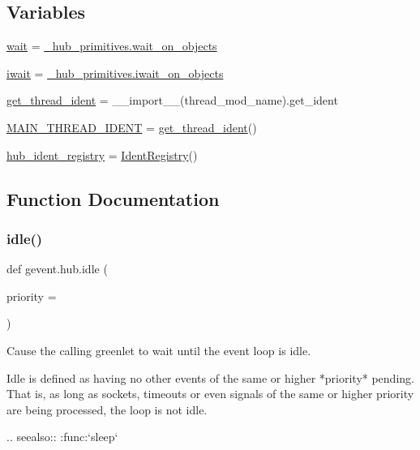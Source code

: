 \subsection*{Variables}
\begin{DoxyCompactItemize}
\item 
\hyperlink{namespacegevent_1_1hub_a5ed661434216439b7d4f2ca4c79fd94f}{wait} = \hyperlink{namespacegevent_1_1__hub__primitives_a670618f9da100eaaa5d2a7b80b746926}{\+\_\+hub\+\_\+primitives.\+wait\+\_\+on\+\_\+objects}
\item 
\hyperlink{namespacegevent_1_1hub_ac0495f7b4e74e001a73e04cb1f92978a}{iwait} = \hyperlink{namespacegevent_1_1__hub__primitives_ae5fd0efa38447d7a7a15f9218ae50c19}{\+\_\+hub\+\_\+primitives.\+iwait\+\_\+on\+\_\+objects}
\item 
\hyperlink{namespacegevent_1_1hub_a25afe960c9af2c46325de894129e1ed2}{get\+\_\+thread\+\_\+ident} = \+\_\+\+\_\+import\+\_\+\+\_\+(thread\+\_\+mod\+\_\+name).get\+\_\+ident
\item 
\hyperlink{namespacegevent_1_1hub_aed3ef3b0ddba2d582cc0b88e3ea2d48f}{M\+A\+I\+N\+\_\+\+T\+H\+R\+E\+A\+D\+\_\+\+I\+D\+E\+NT} = \hyperlink{namespacegevent_1_1hub_a25afe960c9af2c46325de894129e1ed2}{get\+\_\+thread\+\_\+ident}()
\item 
\hyperlink{namespacegevent_1_1hub_aa8f1583d65977ad5d085a66b354a9485}{hub\+\_\+ident\+\_\+registry} = \hyperlink{classgevent_1_1__ident_1_1_ident_registry}{Ident\+Registry}()
\end{DoxyCompactItemize}


\subsection{Function Documentation}
\mbox{\label{namespacegevent_1_1hub_a5bb5e229a2284a64a870e9a049e4d221}} 
\subsubsection{\texorpdfstring{idle()}{idle()}}
{\footnotesize\ttfamily def gevent.\+hub.\+idle (\begin{DoxyParamCaption}\item[{}]{priority = {} }\end{DoxyParamCaption})}

\begin{DoxyVerb}Cause the calling greenlet to wait until the event loop is idle.

Idle is defined as having no other events of the same or higher
*priority* pending. That is, as long as sockets, timeouts or even
signals of the same or higher priority are being processed, the loop
is not idle.

.. seealso:: :func:`sleep`
\end{DoxyVerb}
 \mbox{\label{namespacegevent_1_1hub_a9eeaa02acbf1c48cfa26dc84d245476a}} 
